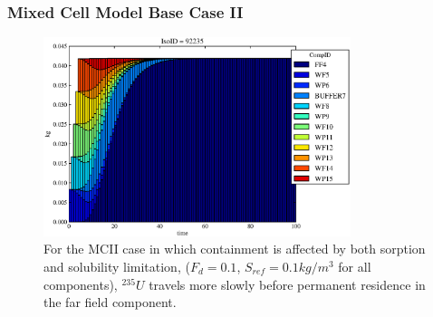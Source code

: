 
\begin{frame}[ctb!]
  \frametitle{Mixed Cell Model Base Case II}
\begin{figure}[ht]
\centering
\includegraphics[width=0.8\textwidth]{./images/mcIII.eps}
\caption[$^{235}U$ residence. Mixed Cell Coupled Sorption and Solubility Limitation.]{
For the MCII case in which containment is affected by both sorption and 
solubility limitation,
($F_{d}=0.1$, $S_{ref}=0.1kg/m^3$ for all components), $^{235}U$ travels more slowly
before permanent residence in the far field component.
}
\label{fig:mcIIIall}
\end{figure}
\end{frame}

